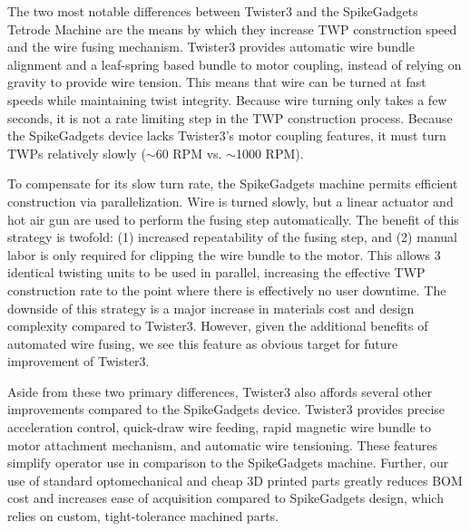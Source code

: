 \documentclass[11pt,a4paper]{article}
\begin{document}
The two most notable differences between Twister3 and the SpikeGadgets Tetrode
Machine are the means by which they increase TWP construction speed and the
wire fusing mechanism. Twister3 provides automatic wire bundle alignment and a
leaf-spring based bundle to motor coupling, instead of relying on gravity to
provide wire tension. This means that wire can be turned at fast
speeds while maintaining twist integrity. Because wire turning only takes a few
seconds, it is not a rate limiting step in the TWP construction process.
Because the SpikeGadgets device lacks Twister3's motor coupling features, it
must turn TWPs relatively slowly ($\sim$60 RPM vs. $\sim$1000 RPM).

To compensate for its slow turn rate, the SpikeGadgets machine permits
efficient construction via parallelization. Wire is turned slowly, but a linear
actuator and hot air gun are used to perform the fusing step automatically. The
benefit of this strategy is twofold: (1) increased repeatability of the fusing
step, and (2) manual labor is only required for clipping the wire bundle
to the motor. This allows 3 identical twisting units to be used in parallel,
increasing the effective TWP construction rate to the point where there is
effectively no user downtime. The downside of this strategy is a major increase
in materials cost and design complexity compared to Twister3. However, given
the additional benefits of automated wire fusing, we see this feature as
obvious target for future improvement of Twister3.

Aside from these two primary differences, Twister3 also affords several other
improvements compared to the SpikeGadgets device. Twister3 provides precise
acceleration control, quick-draw wire feeding, rapid magnetic wire bundle to
motor attachment mechanism, and automatic wire tensioning. These features
simplify operator use in comparison to the SpikeGadgets machine. Further, our
use of standard optomechanical and cheap 3D printed parts greatly reduces BOM
cost and increases ease of acquisition compared to SpikeGadgets design, which
relies on custom, tight-tolerance machined parts.
\end{document}

